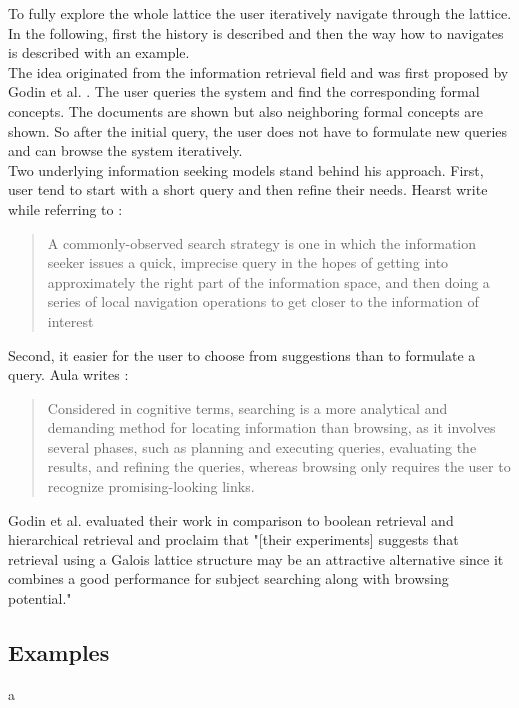 \documentclass[11pt]{report}
\begin{document}
To fully explore the whole lattice the user iteratively navigate through the lattice. In the following, first the history is described and then the way how to navigates is described with an example. \\

The idea originated from the information retrieval field and was first proposed by Godin et al. \cite{Godin1989}. The user queries the system and find the corresponding formal concepts. The documents are shown but also neighboring formal concepts are shown. So after the initial query, the user does not have to formulate new queries and can browse the system iteratively. \\

Two underlying information seeking models stand behind his approach. First, user tend to start with a short query and then refine their needs. Hearst \cite{Hearst2009} write  while referring to \cite{Marchionini2006,Bates1990}:
\begin{quote}
	A commonly-observed search strategy is one in which the information seeker issues a quick, imprecise query in the hopes of getting into approximately the right part of the information space, and then doing a series of local navigation operations to get closer to the information of interest
\end{quote}

Second, it easier for the user to choose from suggestions than to formulate a query. Aula writes \cite{Aula2005}:
\begin{quote}
	Considered in cognitive terms, searching is a more analytical and demanding method for locating information than browsing, as it involves several phases, such as planning and executing queries, evaluating the results, and refining the queries, whereas browsing only requires the user to recognize promising-looking links.
\end{quote}

Godin et al. \cite{Godin1993} evaluated their work in comparison to boolean retrieval and hierarchical retrieval and proclaim that "[their experiments] suggests that retrieval using a Galois lattice structure may be an attractive alternative since it combines a good performance for subject searching along with browsing potential." \\

\subsection{Examples}a
\end{document}
